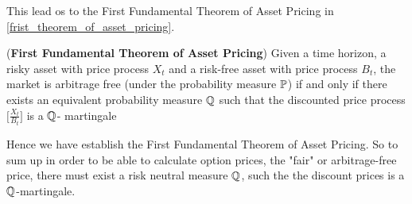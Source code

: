 \noindent 
This lead os to the First Fundamental Theorem of Asset Pricing in \autoref{frist_theorem_of_asset_pricing}.
\begin{theorem}
    (\textbf{First Fundamental Theorem of Asset Pricing})
    Given a time horizon, a risky asset with price process $X_t$ and a
    risk-free asset with price process $B_t$, the market is arbitrage free 
    (under the probability measure $\mathbb{P}$) if and only if there exists an 
    equivalent probability measure $\mathbb{Q}$ such that the discounted price process
    $\Big[\frac{X_t}{B_t}\Big]$  is a $\mathbb{Q}$- martingale \cite{Bjork}
    \label{frist_theorem_of_asset_pricing}
\end{theorem}
\noindent 
Hence we have establish the First Fundamental Theorem of Asset Pricing. So to sum up in order to be able to calculate
option prices, the "fair" or arbitrage-free price, there must exist a risk neutral measure $\mathbb{Q}$, such the the discount prices
is a $\mathbb{Q}$-martingale. 
